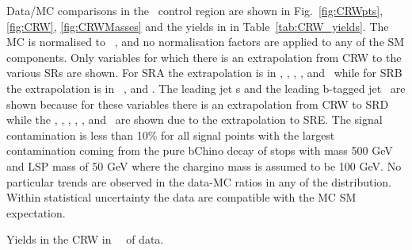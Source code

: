 Data/MC comparisons in the \Wjets\ control region are shown in Fig.~\ref{fig:CRWpts}, \ref{fig:CRW}, \ref{fig:CRWMasses} and the yields in in Table~\ref{tab:CRW_yields}. The MC is normalised to \intlumi\ \ifb, and no normalisation factors are applied to any of the SM components. Only variables for which there is an extrapolation from CRW to the various SRs are shown. For SRA the extrapolation is in \met, \drbjetbjet, \mantikttwelvezero,  \mantikttwelveone, and \mantikteightzero\ while for SRB the extrapolation is in \mtbmin\, \mtbmax, and \drbjetbjet. The leading jet \pt s and the leading b-tagged jet \pt\ are shown because for these variables there is an extrapolation from CRW to SRD while the \met, \mtbmin, \HT, \htsig, \mantikteightzero, and \mantikteightone\ are shown due to the extrapolation to SRE. The signal contamination is less than 10\% for all signal points with the largest contamination coming from the pure bChino decay of stops with mass 500 GeV and LSP mass of 50 GeV where the chargino mass is assumed to be 100 GeV. No particular trends are observed in the data-MC ratios in any of the distribution. Within statistical uncertainty the data are compatible with the MC SM expectation. \\

\begin{table}[!htb]
  \centering
  
  \caption{Yields in the CRW in \intlumi\ \ifb\ of data.  }
  \label{tab:CRW_yields}
\end{table}

